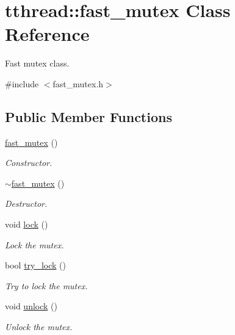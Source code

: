 \hypertarget{classtthread_1_1fast__mutex}{}\section{tthread\+:\+:fast\+\_\+mutex Class Reference}
\label{classtthread_1_1fast__mutex}


Fast mutex class.  




{\ttfamily \#include $<$fast\+\_\+mutex.\+h$>$}

\subsection*{Public Member Functions}
\begin{DoxyCompactItemize}
\item 
\hyperlink{classtthread_1_1fast__mutex_a8cfde7cb742d74951f148cef58518eff}{fast\+\_\+mutex} ()\hypertarget{classtthread_1_1fast__mutex_a8cfde7cb742d74951f148cef58518eff}{}\label{classtthread_1_1fast__mutex_a8cfde7cb742d74951f148cef58518eff}

\begin{DoxyCompactList}\small\item\em Constructor. \end{DoxyCompactList}\item 
\hyperlink{classtthread_1_1fast__mutex_a2fdc596dad48d68c339d3374ab172768}{$\sim$fast\+\_\+mutex} ()\hypertarget{classtthread_1_1fast__mutex_a2fdc596dad48d68c339d3374ab172768}{}\label{classtthread_1_1fast__mutex_a2fdc596dad48d68c339d3374ab172768}

\begin{DoxyCompactList}\small\item\em Destructor. \end{DoxyCompactList}\item 
void \hyperlink{classtthread_1_1fast__mutex_a4fa61071e9e59b0ecab8137eadfc4558}{lock} ()
\begin{DoxyCompactList}\small\item\em Lock the mutex. \end{DoxyCompactList}\item 
bool \hyperlink{classtthread_1_1fast__mutex_a0bd0bcb244bc7680550fb52fe59e5742}{try\+\_\+lock} ()
\begin{DoxyCompactList}\small\item\em Try to lock the mutex. \end{DoxyCompactList}\item 
void \hyperlink{classtthread_1_1fast__mutex_a5b4af3b4eb277bf5e747d3e098dd0c78}{unlock} ()
\begin{DoxyCompactList}\small\item\em Unlock the mutex. \end{DoxyCompactList}\end{DoxyCompactItemize}


